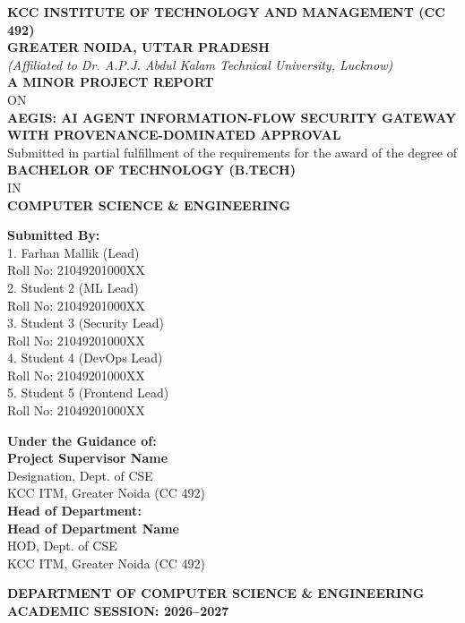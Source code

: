 \begin{titlepage}
\begin{center}

{\Large \textbf{KCC INSTITUTE OF TECHNOLOGY AND MANAGEMENT (CC 492)}}\\[0.2cm]
{\large \textbf{GREATER NOIDA, UTTAR PRADESH}}\\[0.1cm]
{\small \textit{(Affiliated to Dr. A.P.J. Abdul Kalam Technical University, Lucknow)}}\\[1.2cm]

{\large \textbf{A MINOR PROJECT REPORT}}\\[0.2cm]
{\small ON}\\[0.4cm]
{\LARGE \textbf{AEGIS: AI AGENT INFORMATION-FLOW SECURITY GATEWAY WITH PROVENANCE-DOMINATED APPROVAL}}\\[1.2cm]

{\small Submitted in partial fulfillment of the requirements for the award of the degree of}\\[0.3cm]
{\large \textbf{BACHELOR OF TECHNOLOGY (B.TECH)}}\\[0.2cm]
{\small IN}\\[0.2cm]
{\large \textbf{COMPUTER SCIENCE \& ENGINEERING}}\\[1.2cm]

\begin{minipage}{0.48\textwidth}
\begin{flushleft} \small
\textbf{Submitted By:}\\
1. Farhan Mallik (Lead)\\
\quad Roll No: 21049201000XX\\
2. Student 2 (ML Lead)\\
\quad Roll No: 21049201000XX\\
3. Student 3 (Security Lead)\\
\quad Roll No: 21049201000XX\\
4. Student 4 (DevOps Lead)\\
\quad Roll No: 21049201000XX\\
5. Student 5 (Frontend Lead)\\
\quad Roll No: 21049201000XX
\end{flushleft}
\end{minipage}
\hfill
\begin{minipage}{0.48\textwidth}
\begin{flushright} \small
\textbf{Under the Guidance of:}\\
\textbf{Project Supervisor Name}\\
Designation, Dept. of CSE\\
KCC ITM, Greater Noida (CC 492)\\[0.6cm]
\textbf{Head of Department:}\\
\textbf{Head of Department Name}\\
HOD, Dept. of CSE\\
KCC ITM, Greater Noida (CC 492)
\end{flushright}
\end{minipage}

\vfill
{\large \textbf{DEPARTMENT OF COMPUTER SCIENCE \& ENGINEERING}}\\[0.2cm]
{\textbf{ACADEMIC SESSION: 2026--2027}}

\end{center}
\end{titlepage}
